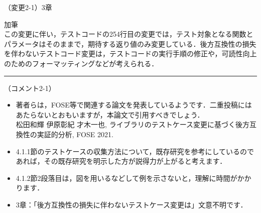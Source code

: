 \documentclass{jarticle} %
\def\subsection#1{ \vspace{1pc} {\gt #1} }
\def\nextans{ \vspace{2pc} \hrule }
\begin{document}
\subsection{（変更2-1）3章}
\vspace{-0.3cm}
\begin{description}
\item 加筆\\
\phantom{　}
この変更に伴い，テストコードの254行目の変更では，テスト対象となる関数とパラメータはそのままで，期待する返り値のみ変更している．\textcolor{red}{}後方互換性の損失を伴わないテストコード変更は，テストコードの実行手順の修正や，可読性向上のためのフォーマッティングなどが考えられる．\textcolor{red}{}
\end{description}


\newpage
\nextans
\subsection{（コメント2-1）}
\begin{itemize}
\item 著者らは，FOSE等で関連する論文を発表しているようです．二重投稿にはあたらないとおもいますが，本論文で引用すべきでしょう．\\
松田和輝 伊原彰紀 才木一也, ライブラリのテストケース変更に基づく後方互換性の実証的分析, FOSE 2021.
\item 4.1.1節のテストケースの収集方法について，既存研究を参考にしているのであれば，その既存研究を明示した方が説得力が上がると考えます．
\item 4.1.2節2段落目は，図を用いるなどして例を示さないと，理解に時間がかかります．
\item 3章：「後方互換性の損失に伴わないテストケース変更は」文意不明です．
\end{itemize}
\end{document}
